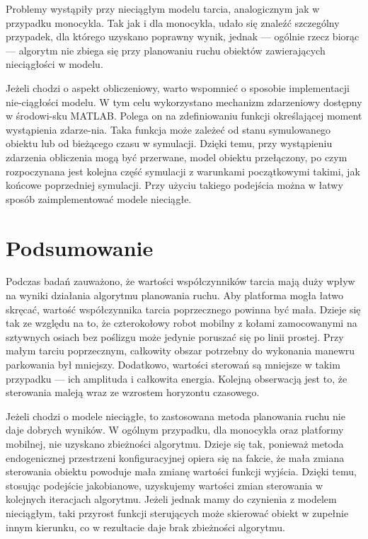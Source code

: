 Problemy wystąpiły przy nieciągłym modelu tarcia, analogicznym jak w przypadku monocykla. Tak jak i dla monocykla, udało się znaleźć szczególny przypadek, dla którego uzyskano poprawny wynik, jednak --- ogólnie rzecz biorąc --- algorytm nie zbiega się przy planowaniu ruchu obiektów zawierających nieciągłości w modelu.

Jeżeli chodzi o aspekt obliczeniowy, warto wspomnieć o sposobie implementacji nie-ciągłości modelu. W tym celu wykorzystano mechanizm zdarzeniowy dostępny w środowi-sku MATLAB. Polega on na zdefiniowaniu funkcji określającej moment wystąpienia zdarze-nia. Taka funkcja może zależeć od stanu symulowanego obiektu lub od bieżącego czasu w symulacji. Dzięki temu, przy wystąpieniu zdarzenia obliczenia mogą być przerwane, model obiektu przełączony, po czym rozpoczynana jest kolejna część symulacji z warunkami początkowymi takimi, jak końcowe poprzedniej symulacji. Przy użyciu takiego podejścia można w łatwy sposób zaimplementować modele nieciągłe.

\section{Podsumowanie}
Podczas badań zauważono, że wartości współczynników tarcia mają duży wpływ na wyniki działania algorytmu planowania ruchu. Aby platforma mogła łatwo skręcać, wartość współczynnika tarcia poprzecznego powinna być mała. Dzieje się tak ze względu na to, że czterokołowy robot mobilny z kołami zamocowanymi na sztywnych osiach bez poślizgu może jedynie poruszać się po linii prostej. Przy małym tarciu poprzecznym, całkowity obszar potrzebny do wykonania manewru parkowania był mniejszy. Dodatkowo, wartości sterowań są mniejsze w takim przypadku --- ich amplituda i całkowita energia. Kolejną obserwacją jest to, że sterowania maleją wraz ze wzrostem horyzontu czasowego. 

Jeżeli chodzi o modele nieciągłe, to zastosowana metoda planowania ruchu nie daje dobrych wyników. W ogólnym przypadku, dla monocykla oraz platformy mobilnej, nie uzyskano zbieżności algorytmu. Dzieje się tak, ponieważ metoda endogenicznej przestrzeni konfiguracyjnej opiera się na fakcie, że mała zmiana sterowania obiektu powoduje mała zmianę wartości funkcji wyjścia. Dzięki temu, stosując podejście jakobianowe, uzyskujemy wartości zmian sterowania w kolejnych iteracjach algorytmu. Jeżeli jednak mamy do czynienia z modelem nieciągłym, taki przyrost funkcji sterujących może skierować obiekt w zupełnie innym kierunku, co w rezultacie daje brak zbieżności algorytmu.